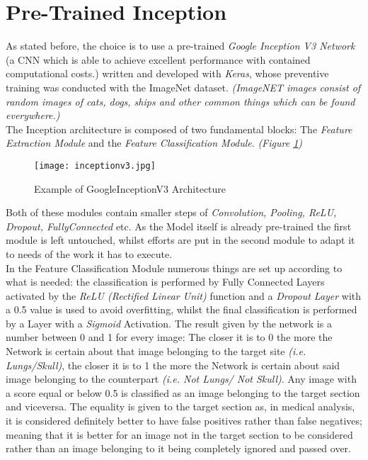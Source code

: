 \documentclass[../main.tex]{subfiles}
\begin{document}
\section{Pre-Trained Inception}
As stated before, the choice is to use a pre-trained \textit{Google Inception V3 Network} (a CNN which is able to achieve excellent performance with contained computational costs.\cite{Szegedy2015a}) written and developed with \textit{Keras}, whose preventive training was conducted with the ImageNet dataset. \cite{kerasinception} \textit{(ImageNET images consist of random images of cats, dogs, ships and other common things which can be found everywhere.)} \\
The Inception architecture is composed of two fundamental blocks: The \textit{Feature Extraction Module} and the \textit{Feature Classification Module}. \textit{(Figure \ref{fig:inceptionv3})}

\begin{figure}[H]
\centering
\texttt{[image: inceptionv3.jpg]}
\caption{Example of GoogleInceptionV3 Architecture}
\label{fig:inceptionv3}
\end{figure}

Both of these modules contain smaller steps of \textit{Convolution, Pooling, ReLU, Dropout, FullyConnected} etc. As the Model itself is already pre-trained the first module is left untouched, whilst efforts are put in the second module to adapt it to needs of the work it has to execute.\\
In the Feature Classification Module numerous things are set up according to what is needed: the classification is performed by Fully Connected Layers activated by the \textit{ReLU (Rectified Linear Unit)} function and a \textit{Dropout Layer} with a 0.5 value is used to avoid overfitting, whilst the final classification is performed by a Layer with a \textit{Sigmoid} Activation. The result given by the network is a number between 0 and 1 for every image: The closer it is to 0 the more the Network is certain about that image belonging to the target site \textit{(i.e. Lungs/Skull)}, the closer it is to 1 the more the Network is certain about said image belonging to the counterpart \textit{(i.e. Not Lungs/ Not Skull)}. Any image with a score equal or below 0.5 is classified as an image belonging to the target section and viceversa. The equality is given to the target section as, in medical analysis, it is considered definitely better to have false positives rather than false negatives; meaning that it is better for an image not in the target section to be considered rather than an image belonging to it being completely ignored and passed over. 
\end{document}
